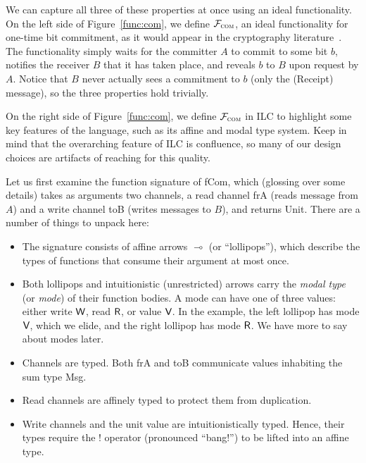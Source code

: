 We can capture all three of these properties at once using an ideal
functionality. On the left side of Figure~\ref{func:com}, we define
$\mathcal{{F}}_{\textsc{com}}$, an ideal functionality for one-time bit commitment, as
it would appear in the cryptography
literature~\cite{canetti2001commitments}. The functionality simply waits for the
committer $A$ to commit to some bit $b$, notifies the receiver $B$ that it has
taken place, and reveals $b$ to $B$ upon request by $A$. Notice that $B$ never
actually sees a commitment to $b$ (only the (\textsf{Receipt}) message), so the
three properties hold trivially.

On the right side of Figure~\ref{func:com}, we define $\mathcal{{F}}_{\textsc{com}}$ in
ILC to highlight some key features of the language, such as its affine and modal
type system. Keep in mind that the overarching feature of ILC is confluence, so
many of our design choices are artifacts of reaching for this
quality. \smallskip

Let us first examine the function signature of \textsf{fCom}, which (glossing
over some details) takes as arguments two channels, a read channel \textsf{frA}
(reads message from $A$) and a write channel \textsf{toB} (writes messages to
$B$), and returns \textsf{Unit}. There are a number of things to unpack here:

\begin{itemize}[leftmargin=*]
  \item The signature consists of affine arrows $\multimap$ (or ``lollipops''), which
    describe the types of functions that consume their argument at most once.
  \item Both lollipops and intuitionistic (unrestricted) arrows carry the
    \emph{modal type} (or \emph{mode}) of their function bodies. A mode can have
    one of three values: either write $\textsf{W}$, read $\textsf{R}$, or value $\textsf{V}$.  In the
    example, the left lollipop has mode $\textsf{V}$, which we elide, and the right
    lollipop has mode $\textsf{R}$. We have more to say about modes later.
  \item Channels are typed. Both \textsf{frA} and \textsf{toB} communicate
    values inhabiting the sum type \textsf{Msg}.
  \item Read channels are affinely typed to protect them from duplication.
  \item Write channels and the unit value are intuitionistically typed. Hence,
    their types require the ! operator (pronounced ``bang!'') to be lifted into
    an affine type.
\end{itemize}

